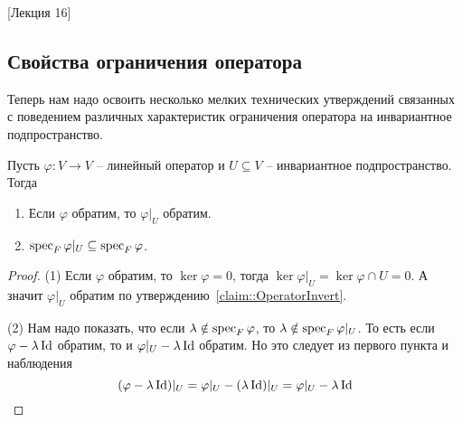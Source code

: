 [Лекция 16]


\subsection{Свойства ограничения оператора}

Теперь нам надо освоить несколько мелких технических утверждений связанных с поведением различных характеристик ограничения оператора на инвариантное подпространство.

\begin{claim}
Пусть $\varphi\colon V\to V$ -- линейный оператор и $U\subseteq V$ -- инвариантное подпространство. Тогда
\begin{enumerate}
\item Если $\varphi$ обратим, то $\varphi|_U$ обратим.
\item $\operatorname{spec}_F \varphi|_U\subseteq \operatorname{spec}_F \varphi$.
\end{enumerate}
\end{claim}
\begin{proof}
(1) Если $\varphi$ обратим, то $\ker \varphi = 0$, тогда $\ker \varphi|_U = \ker \varphi \cap U = 0$. А значит $\varphi|_U$ обратим по утверждению~\ref{claim::OperatorInvert}.

(2) Нам надо показать, что если $\lambda\notin\operatorname{spec}_F \varphi$, то $\lambda\notin\operatorname{spec}_F \varphi|_U$. То есть если $\varphi-\lambda\operatorname{Id}$ обратим, то и $\varphi|_U-\lambda \operatorname{Id}$ обратим. Но это следует из первого пункта и наблюдения 
\[
(\varphi - \lambda \operatorname{Id})|_U = \varphi|_U -(\lambda\operatorname{Id})|_U = \varphi|_U - \lambda \operatorname{Id}
\]
\end{proof}



